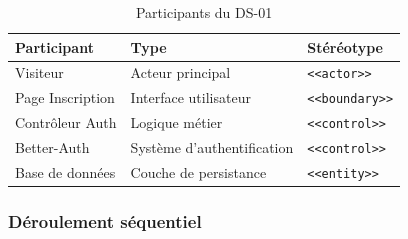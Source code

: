 \documentclass[12pt,a4paper]{article}
\begin{document}
\begin{table}[h!]
\centering
\begin{tabular}{lll}
\toprule
\textbf{Participant} & \textbf{Type} & \textbf{Stéréotype} \\
\midrule
Visiteur & Acteur principal & \texttt{<<actor>>} \\
Page Inscription & Interface utilisateur & \texttt{<<boundary>>} \\
Contrôleur Auth & Logique métier & \texttt{<<control>>} \\
Better-Auth & Système d'authentification & \texttt{<<control>>} \\
Base de données & Couche de persistance & \texttt{<<entity>>} \\
\bottomrule
\end{tabular}
\caption{Participants du DS-01}
\end{table}

\subsubsection{Déroulement séquentiel}
\end{document}
